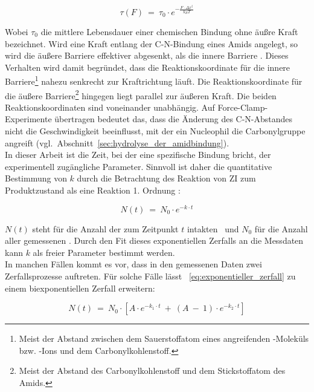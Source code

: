 \begin{equation}
	\tau(F)~=~\tau_0 \cdot e^{- \frac{F \cdot \Delta x^\ddag}{k_BT}}
	\label{eq:tau_kraftabhängig}
\end{equation}

Wobei $\tau_0$ die mittlere Lebensdauer einer chemischen Bindung ohne äußre Kraft bezeichnet. Wird eine Kraft entlang der C-N-Bindung eines Amids angelegt, so wird die äußere Barriere effektiver abgesenkt, als die innere Barriere \cite{Xia.2011,Tian.2013}. Dieses Verhalten wird damit begründet, dass die Reaktionskoordinate für die innere Barriere\footnote{Meist der Abstand zwischen dem Sauerstoffatom eines angreifenden -Moleküls bzw. -Ions und dem Carbonylkohlenstoff.} nahezu senkrecht zur Kraftrichtung läuft. Die Reaktionskoordinate für die äußere Barriere\footnote{Meist der Abstand des Carbonylkohlenstoff und dem Stickstoffatom des Amids.} hingegen liegt parallel zur äußeren Kraft. Die beiden Reaktionskoordinaten sind voneinander unabhängig. Auf Force-Clamp-Experimente übertragen bedeutet das, dass die Änderung des C-N-Abstandes nicht die Geschwindigkeit beeinflusst, mit der ein Nucleophil die Carbonylgruppe angreift (vgl.~Abschnitt~\ref{sec:hydrolyse_der_amidbindung}).\\

In dieser Arbeit ist die Zeit, bei der eine spezifische Bindung bricht, der experimentell zugängliche Parameter. Sinnvoll ist daher die quantitative Bestimmung von $k$ durch die Betrachtung des Reaktion von  \ac{ZI} zum Produktzustand als eine Reaktion 1. Ordnung \cite{MichaelF.Pill.2015}:

\begin{equation}
	N(t)~=~N_0 \cdot e^{-k \cdot t}
	\label{eq:exponentieller_zerfall}
\end{equation}

$N(t)$ steht für die Anzahl der zum Zeitpunkt $t$ intakten \amide~und $N_0$ für die Anzahl aller gemessenen \amide. Durch den Fit dieses exponentiellen Zerfalls an die Messdaten kann $k$ als freier Parameter bestimmt werden.\\
In manchen Fällen kommt es vor, dass in den gemessenen Daten zwei Zerfallsprozesse auftreten. Für solche Fälle lässt \gl~\ref{eq:exponentieller_zerfall} zu einem biexponentiellen Zerfall erweitern:

\begin{equation}
	N(t)~=~N_0 \cdot [A \cdot e^{-k_1 \cdot t}~+~(A~-~1) \cdot e^{-k_2 \cdot t}]
	\label{eq:biexponentieller_zerfall}
\end{equation}

